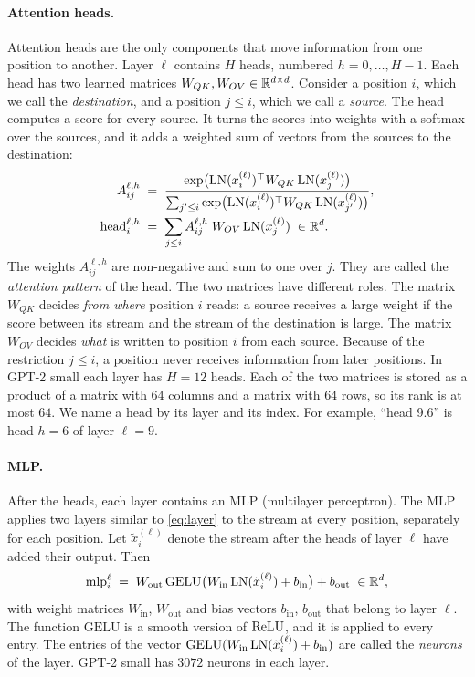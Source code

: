 \paragraph{Attention heads.} Attention heads are the only components that move information from one position to
another. Layer $\ell$ contains $H$ heads, numbered $h=0,\dots,H-1$. Each head has two learned matrices
$W_{QK},W_{OV}\in\mathbb{R}^{d\times d}$. Consider a position $i$, which we call the \emph{destination}, and a position
$j\le i$, which we call a \emph{source}. The head computes a score for every source. It turns the scores into
weights with a softmax over the sources, and it adds a weighted sum of vectors from the sources to the
destination:
\begin{align}
A^{\ell,h}_{ij} &\;=\; \frac{\exp\!\big(\mathrm{LN}(x_i^{(\ell)})^\top W_{QK}\,\mathrm{LN}(x_j^{(\ell)})\big)}
{\sum_{j'\le i}\exp\!\big(\mathrm{LN}(x_i^{(\ell)})^\top W_{QK}\,\mathrm{LN}(x_{j'}^{(\ell)})\big)},
\label{eq:pattern}\\
\mathrm{head}_i^{\ell,h} &\;=\; \sum_{j\le i}A^{\ell,h}_{ij}\;W_{OV}\,\mathrm{LN}(x_j^{(\ell)}) \;\in\mathbb{R}^d. \label{eq:headout}
\end{align}
The weights $A^{\ell,h}_{ij}$ are non-negative and sum to one over $j$. They are called the \emph{attention
pattern} of the head. The two matrices have different roles. The matrix $W_{QK}$ decides \emph{from where}
position $i$ reads: a source receives a large weight if the score between its stream and the stream of the
destination is large. The matrix $W_{OV}$ decides \emph{what} is written to position $i$ from each source. Because
of the restriction $j\le i$, a position never receives information from later positions. In GPT-2 small each layer
has $H=12$ heads. Each of the two matrices is stored as a product of a matrix with $64$ columns and a matrix with
$64$ rows, so its rank is at most $64$. We name a head by its layer and its index. For example, ``head 9.6'' is
head $h=6$ of layer $\ell=9$.

\paragraph{MLP.} After the heads, each layer contains an MLP (multilayer perceptron). The MLP applies two layers
similar to \eqref{eq:layer} to the stream at every position, separately for each position. Let
$\tilde x_i^{(\ell)}$ denote the stream after the heads of layer $\ell$ have added their output. Then
\begin{equation}\label{eq:mlp}
\mathrm{mlp}_i^{\ell} \;=\; W_{\mathrm{out}}\,\mathrm{GELU}\big(W_{\mathrm{in}}\,\mathrm{LN}(\tilde x_i^{(\ell)})+b_{\mathrm{in}}\big)+b_{\mathrm{out}} \;\in\mathbb{R}^d,
\end{equation}
with weight matrices $W_{\mathrm{in}}$, $W_{\mathrm{out}}$ and bias vectors $b_{\mathrm{in}}$, $b_{\mathrm{out}}$ that
belong to layer $\ell$. The function $\mathrm{GELU}$ is a smooth version of $\mathrm{ReLU}$, and it is applied to every
entry. The entries of the vector $\mathrm{GELU}(W_{\mathrm{in}}\,\mathrm{LN}(\tilde x_i^{(\ell)})+b_{\mathrm{in}})$ are
called the \emph{neurons} of the layer. GPT-2 small has $3072$ neurons in each layer.

